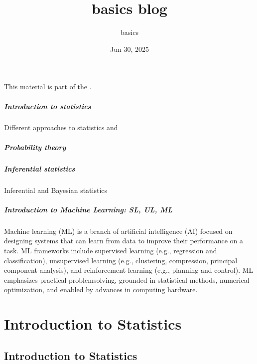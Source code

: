 \documentclass[letterpaper,10pt,english]{jupyterBook}
\title{basics blog}
\date{Jun 30, 2025}
\author{basics}
\begin{document}
\pagestyle{empty}
\sphinxmaketitle
\pagestyle{plain}
\sphinxtableofcontents
\pagestyle{normal}
\label{\detokenize{intro::doc}}


\sphinxAtStartPar
This material is part of the .

\sphinxAtStartPar
{}
\subsubsection*{Introduction to statistics}

\sphinxAtStartPar
Different approaches to statistics and 
\subsubsection*{Probability theory}
\subsubsection*{Inferential statistics}

\sphinxAtStartPar
Inferential and Bayesian statistics
\subsubsection*{Introduction to Machine Learning: SL, UL, ML}

\sphinxAtStartPar
Machine learning (ML) is a branch of artificial intelligence (AI) focused on designing systems that can learn from data to improve their performance on a task. ML frameworks include supervised learning (e.g., regression and classification), unsupervised learning (e.g., clustering, compression, principal component analysis), and reinforcement learning (e.g., planning and control). ML emphasizes practical problem\sphinxhyphen{}solving, grounded in statistical methods, numerical optimization, and enabled by advances in computing hardware.





\sphinxstepscope


\part{Introduction to Statistics}

\sphinxstepscope


\chapter{Introduction to Statistics}
\label{\detokenize{ch/intro/intro:introduction-to-statistics}}\label{\detokenize{ch/intro/intro:intro-intro}}\label{\detokenize{ch/intro/intro::doc}}
\sphinxstepscope
\end{document}
